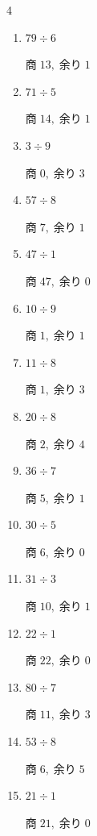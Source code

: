 \begin{multicols}{4}
\begin{enumerate}
\columnbreak %

  \item $79 \div 6$

        $商\; 13,\; 余り\; 1$

  \item $71 \div 5$

        $商\; 14,\; 余り\; 1$

  \item $3 \div 9$

        $商\; 0,\; 余り\; 3$

  \item $57 \div 8$

        $商\; 7,\; 余り\; 1$

  \item $47 \div 1$

        $商\; 47,\; 余り\; 0$

  \item $10 \div 9$

        $商\; 1,\; 余り\; 1$

  \item $11 \div 8$

        $商\; 1,\; 余り\; 3$

  \item $20 \div 8$

        $商\; 2,\; 余り\; 4$

  \item $36 \div 7$

        $商\; 5,\; 余り\; 1$

  \item $30 \div 5$

        $商\; 6,\; 余り\; 0$

  \item $31 \div 3$

        $商\; 10,\; 余り\; 1$

  \item $22 \div 1$

        $商\; 22,\; 余り\; 0$

  \item $80 \div 7$

        $商\; 11,\; 余り\; 3$

  \item $53 \div 8$

        $商\; 6,\; 余り\; 5$

  \item $21 \div 1$

        $商\; 21,\; 余り\; 0$


\end{enumerate}
\end{multicols}
